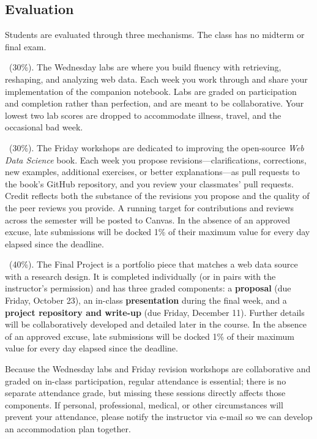 \documentclass[11pt]{memoir}
\begin{document}
\subsection{Evaluation}
Students are evaluated through three mechanisms. The class has no midterm or final exam.

    \begin{description}[itemsep=0pt,labelsep=0pt,leftmargin=1em]

        \item[Notebook Labs]~(30\%). The Wednesday labs are where you build fluency with retrieving, reshaping, and analyzing web data. Each week you work through and share your implementation of the companion notebook. Labs are graded on participation and completion rather than perfection, and are meant to be collaborative. Your lowest two lab scores are dropped to accommodate illness, travel, and the occasional bad week.

        \item[Textbook Revisions]~(30\%). The Friday workshops are dedicated to improving the open-source \textit{Web Data Science} book. Each week you propose revisions---clarifications, corrections, new examples, additional exercises, or better explanations---as pull requests to the book's GitHub repository, and you review your classmates' pull requests. Credit reflects both the substance of the revisions you propose and the quality of the peer reviews you provide. A running target for contributions and reviews across the semester will be posted to Canvas. In the absence of an approved excuse, late submissions will be docked 1\% of their maximum value for every day elapsed since the deadline.

        \item[Final Project]~(40\%). The Final Project is a portfolio piece that matches a web data source with a research design. It is completed individually (or in pairs with the instructor's permission) and has three graded components: a \textbf{proposal} (due Friday, October 23), an in-class \textbf{presentation} during the final week, and a \textbf{project repository and write-up} (due Friday, December 11). Further details will be collaboratively developed and detailed later in the course. In the absence of an approved excuse, late submissions will be docked 1\% of their maximum value for every day elapsed since the deadline.

    \end{description}

Because the Wednesday labs and Friday revision workshops are collaborative and graded on in-class participation, regular attendance is essential; there is no separate attendance grade, but missing these sessions directly affects those components. If personal, professional, medical, or other circumstances will prevent your attendance, please notify the instructor via e-mail so we can develop an accommodation plan together.
\end{document}
